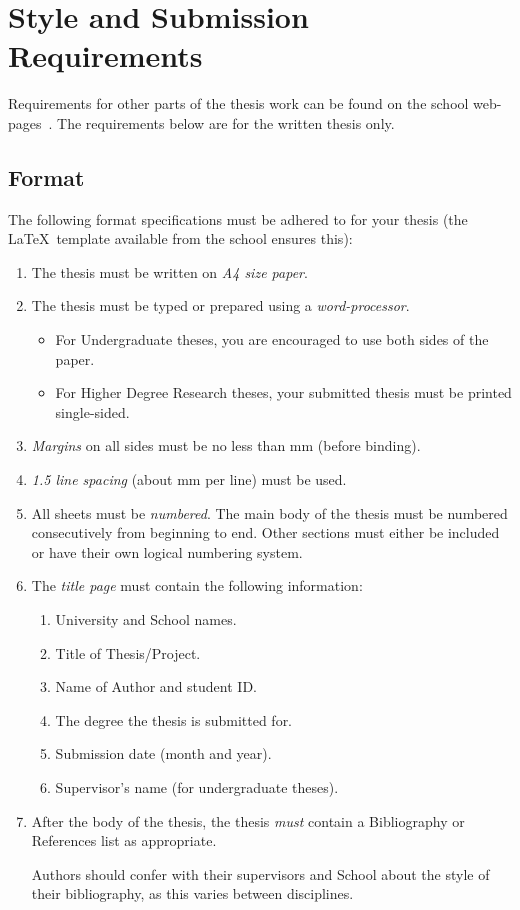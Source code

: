 \chapter{Style and Submission Requirements}

Requirements for other parts of the thesis work can be found on the school
web-pages~\cite{Noo05}.  The requirements below are for the written thesis
only.

\section{Format}
The following format specifications must be adhered to for your thesis
(the \LaTeX\ template available from the school ensures this):
\begin{enumerate}
\item The thesis must be written on \emph{A4 size paper}.
\item The thesis must be typed or prepared using a \emph{word-processor}.
\begin{itemize}
\item For Undergraduate theses, you are encouraged to use both sides
  of the paper.
\item For Higher Degree Research theses, your submitted thesis must be
   printed single-sided.
\end{itemize}
\item \emph{Margins} on all sides must be no less than \unit[20]{mm} (before
binding).
\item \emph{1.5 line spacing} (about \unit[8]{mm} per line) must be used.
\item All sheets must be \emph{numbered}. The main body of the thesis must be
numbered consecutively from beginning to end.  Other sections must either
be included or have their own logical numbering system.
\item The \emph{title page} must contain the following information:
\begin{enumerate}
\item University and School names.
\item Title of Thesis/Project.
\item Name of Author and student ID.
\item The degree the thesis is submitted for.
\item Submission date (month and year).
\item Supervisor's name (for undergraduate theses).
\end{enumerate}
\item After the body of the thesis, the thesis \emph{must} contain a
  Bibliography or References list as appropriate.

Authors should confer with their supervisors and School about the
style of their bibliography, as this varies between disciplines.
\end{enumerate}


